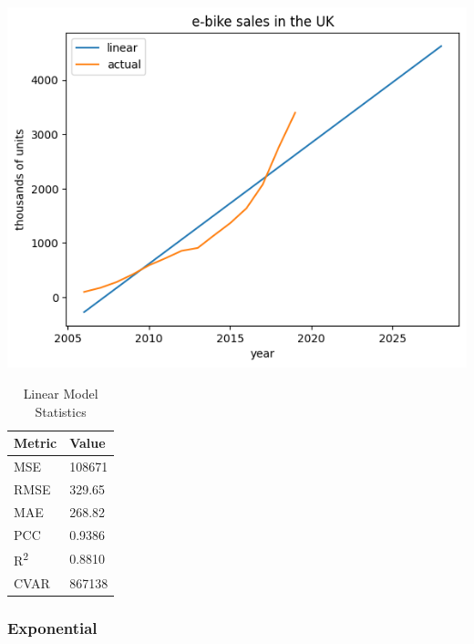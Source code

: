 \begin{table}[h]
    \begin{minipage}{0.7\linewidth}
        \centering
        \includegraphics[width=\textwidth]{linear}%
        \label{fig:ebike_lr}
    \end{minipage}%
    \begin{minipage}{0.3\linewidth}
        \centering
        \begin{tabular}{ll}
            \toprule
            Metric               & Value  \\
            \midrule
            MSE                  & 108671 \\
            RMSE                 & 329.65 \\
            MAE                  & 268.82 \\
            PCC                  & 0.9386 \\
            R\textsuperscript{2} & 0.8810 \\
            CVAR                 & 867138 \\
            \bottomrule
        \end{tabular}
        \vspace{8pt}
        \caption{Linear Model Statistics}
        \label{tab:ebike_lr_err}
    \end{minipage}
\end{table}


\subsubsection*{Exponential}

